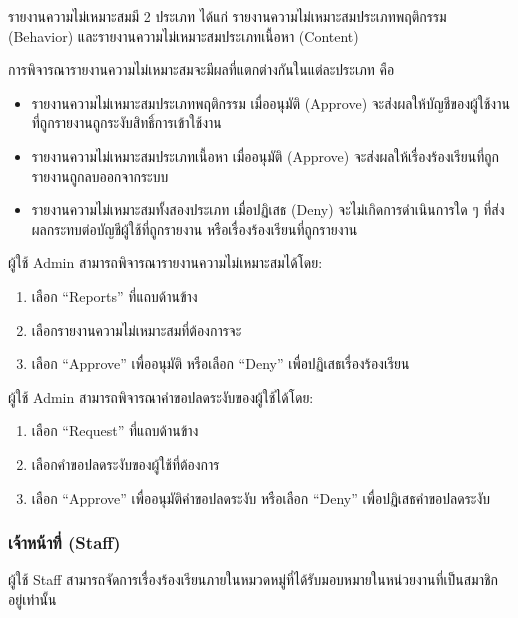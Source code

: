 
รายงานความไม่เหมาะสมมี 2 ประเภท ได้แก่ รายงานความไม่เหมาะสมประเภทพฤติกรรม (Behavior) และรายงานความไม่เหมาะสมประเภทเนื้อหา (Content)

การพิจารณารายงานความไม่เหมาะสมจะมีผลที่แตกต่างกันในแต่ละประเภท คือ

\begin{itemize}
    \item รายงานความไม่เหมาะสมประเภทพฤติกรรม เมื่ออนุมัติ (Approve) จะส่งผลให้บัญชีของผู้ใช้งานที่ถูกรายงานถูกระงับสิทธิ์การเข้าใช้งาน
    \item รายงานความไม่เหมาะสมประเภทเนื้อหา เมื่ออนุมัติ (Approve) จะส่งผลให้เรื่องร้องเรียนที่ถูกรายงานถูกลบออกจากระบบ
    \item รายงานความไม่เหมาะสมทั้งสองประเภท เมื่อปฏิเสธ (Deny) จะไม่เกิดการดำเนินการใด ๆ ที่ส่งผลกระทบต่อบัญชีผู้ใช้ที่ถูกรายงาน หรือเรื่องร้องเรียนที่ถูกรายงาน
\end{itemize}

\pagebreak[4]

ผู้ใช้ Admin สามารถพิจารณารายงานความไม่เหมาะสมได้โดย:

\begin{enumerate}
    \item เลือก ``Reports'' ที่แถบด้านข้าง
    \item เลือกรายงานความไม่เหมาะสมที่ต้องการจะ
    \item เลือก ``Approve'' เพื่ออนุมัติ หรือเลือก ``Deny'' เพื่อปฏิเสธเรื่องร้องเรียน
\end{enumerate}


ผู้ใช้ Admin สามารถพิจารณาคำขอปลดระงับของผู้ใช้ได้โดย:

\begin{enumerate}
    \item เลือก ``Request'' ที่แถบด้านข้าง
    \item เลือกคำขอปลดระงับของผู้ใช้ที่ต้องการ
    \item เลือก ``Approve'' เพื่ออนุมัติคำขอปลดระงับ หรือเลือก ``Deny'' เพื่อปฏิเสธคำขอปลดระงับ
\end{enumerate}

\subsubsection{เจ้าหน้าที่ (Staff)}\label{subsubsec:role-usage-staff}

ผู้ใช้ Staff สามารถจัดการเรื่องร้องเรียนภายในหมวดหมู่ที่ได้รับมอบหมายในหน่วยงานที่เป็นสมาชิกอยู่เท่านั้น

